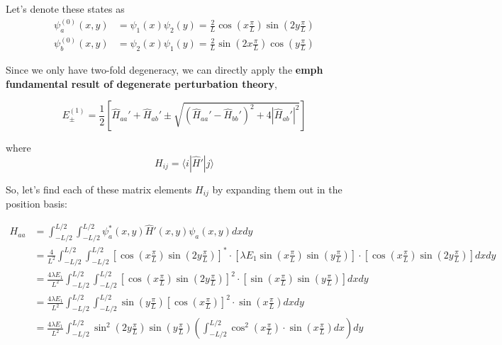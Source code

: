 \documentclass{article}
\newcommand{\inner}[2]{\langle #1 | #2 \rangle}
\begin{document}
\vskip 0.25cm
Let's denote these states as 
\begin{align*}
  \psi_{a}^{(0)}(x, y) &= \psi_1(x)\psi_2(y) = \frac{2}{L} \cos\left(x \frac{\pi}{L}\right) \sin\left(2 y \frac{\pi}{L}\right) \\
  \psi_{b}^{(0)}(x, y) &= \psi_2(x)\psi_1(y) = \frac{2}{L} \sin\left(2 x \frac{\pi}{L}\right) \cos\left(y \frac{\pi}{L}\right)
\end{align*}

\vskip 0.25cm

Since we only have two-fold degeneracy, we can directly apply the \textbf{emph
fundamental result of degenerate perturbation theory},

\[ E_{\pm}^{(1)} = \frac{1}{2} \left[ \hat{H}_{aa}' + \hat{H}_{ab}' \pm \sqrt{(\hat{H}_{aa}' - \hat{H}_{bb}')^2 + 4 \left| \hat{H}_{ab}' \right|^2 } \right] \]

where 
\[ H_{ij} = \inner{i}{\hat{H}' | j} \]

So, let's find each  of these matrix elements $H_{ij}$ by expanding them out in the position basis:

\begin{align*}
  H_{aa} &= \int_{-L/2}^{L/2}  \int_{-L/2}^{L/2}  \psi_a^{*}(x, y) \hat{H}'(x, y) \psi_a(x, y) dx dy \\
  &= \frac{4}{L^2} \int_{-L/2}^{L/2}  \int_{-L/2}^{L/2} \left[ \cos\left(x \frac{\pi}{L}\right) \sin\left(2 y \frac{\pi}{L}\right) \right]^{*} \cdot \left[ \lambda E_1 \sin \left(x \frac{\pi}{L}\right) \sin \left( y \frac{\pi}{L} \right)  \right] \cdot \left[ \cos\left(x \frac{\pi}{L}\right) \sin\left(2 y \frac{\pi}{L}\right) \right] dx dy \\
  &= \frac{4\lambda E_1}{L^2} \int_{-L/2}^{L/2} \int_{-L/2}^{L/2} \left[ \cos\left(x \frac{\pi}{L}\right) \sin\left(2 y \frac{\pi}{L}\right) \right]^2 \cdot \left[ \sin \left(x \frac{\pi}{L}\right) \sin \left( y \frac{\pi}{L} \right)  \right] dx dy \\
  &= \frac{4\lambda E_1}{L^2} \int_{-L/2}^{L/2} \int_{-L/2}^{L/2} \sin \left( y \frac{\pi}{L} \right)  \left[ \cos\left(x \frac{\pi}{L}\right) \right]^2 \cdot \sin \left(x \frac{\pi}{L}\right) dx dy \\
  &= \frac{4\lambda E_1}{L^2}  \int_{-L/2}^{L/2} \sin^2\left( 2y\frac{\pi}{L} \right) \sin \left( y \frac{\pi}{L} \right) \left( \int_{-L/2}^{L/2}   \cos^2\left(x \frac{\pi}{L}\right) \cdot \sin \left(x \frac{\pi}{L}\right) dx\right) dy \\
\end{align*}
\end{document}
